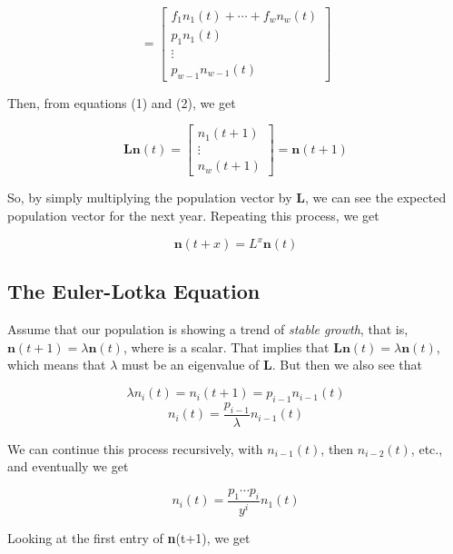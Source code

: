 \documentclass{article}
\begin{document}
\begin{equation*}
= \begin{bmatrix}
f_1n_1(t) + \cdots + f_wn_w(t) \\
p_1n_1(t) \\
\vdots \\
p_{w-1}n_{w-1}(t)
\end{bmatrix}
\end{equation*}

Then, from equations (1) and (2), we get

\begin{equation*}
\mathbf{Ln}(t)= \begin{bmatrix}
n_1(t+1) \\
\vdots \\
n_w(t+1)
\end{bmatrix}
=\mathbf{n}(t+1)
\end{equation*}

So, by simply multiplying the population vector by \textbf{L}, we can see the expected population vector for the next year. Repeating this process, we get

\begin{equation*}
\mathbf{n}(t+x)=L^x\textbf{n}(t)
\end{equation*}

\subsection{The Euler-Lotka Equation}
Assume that our population is showing a trend of \textit{stable growth}, that is, $ \mathbf{n}(t+1)=\lambda \mathbf{n}(t) $, where \textit{\lambda} is a scalar. That implies that $ \mathbf{Ln}(t)=\lambda \mathbf{n}(t) $, which means that $ \lambda $ must be an eigenvalue of \textbf{L}. But then we also see that

\begin{equation*}
\lambda n_{i}(t)=n_i(t+1)=p_{i-1}n_{i-1}(t)
\end{equation*}
\begin{equation*}
n_{i}(t)= \dfrac{p_{i-1}}{\lambda}n_{i-1}(t)
\end{equation*}

We can continue this process recursively, with $ n_{i-1}(t) $, then $ n_{i-2}(t) $, etc., and eventually we get

\begin{equation}
n_i(t)= \frac{p_1 \cdots p_{i}}{y^i}n_1(t)
\end{equation}

Looking at the first entry of \textbf{n}(t+1), we get
\end{document}

